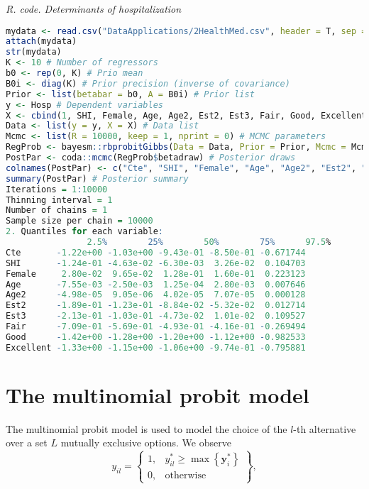 \begin{tcolorbox}[enhanced,width=4.67in,center upper,
	fontupper=\large\bfseries,drop shadow southwest,sharp corners]
	\textit{R. code. Determinants of hospitalization}
	\begin{VF}
		\begin{lstlisting}[language=R]	
mydata <- read.csv("DataApplications/2HealthMed.csv", header = T, sep = ",")
attach(mydata)
str(mydata)
K <- 10 # Number of regressors
b0 <- rep(0, K) # Prio mean
B0i <- diag(K) # Prior precision (inverse of covariance)
Prior <- list(betabar = b0, A = B0i) # Prior list
y <- Hosp # Dependent variables
X <- cbind(1, SHI, Female, Age, Age2, Est2, Est3, Fair, Good, Excellent) # Regressors
Data <- list(y = y, X = X) # Data list
Mcmc <- list(R = 10000, keep = 1, nprint = 0) # MCMC parameters
RegProb <- bayesm::rbprobitGibbs(Data = Data, Prior = Prior, Mcmc = Mcmc) # Inference using bayesm package
PostPar <- coda::mcmc(RegProb$betadraw) # Posterior draws
colnames(PostPar) <- c("Cte", "SHI", "Female", "Age", "Age2", "Est2", "Est3", "Fair", "Good", "Excellent") # Names
summary(PostPar) # Posterior summary
Iterations = 1:10000
Thinning interval = 1 
Number of chains = 1 
Sample size per chain = 10000
2. Quantiles for each variable:
				2.5%        25%        50%        75%      97.5%
Cte       -1.22e+00 -1.03e+00 -9.43e-01 -8.50e-01 -0.671744
SHI       -1.24e-01 -4.63e-02 -6.30e-03  3.26e-02  0.104703
Female     2.80e-02  9.65e-02  1.28e-01  1.60e-01  0.223123
Age       -7.55e-03 -2.50e-03  1.25e-04  2.80e-03  0.007646
Age2      -4.98e-05  9.05e-06  4.02e-05  7.07e-05  0.000128
Est2      -1.89e-01 -1.23e-01 -8.84e-02 -5.32e-02  0.012714
Est3      -2.13e-01 -1.03e-01 -4.73e-02  1.01e-02  0.109527
Fair      -7.09e-01 -5.69e-01 -4.93e-01 -4.16e-01 -0.269494
Good      -1.42e+00 -1.28e+00 -1.20e+00 -1.12e+00 -0.982533
Excellent -1.33e+00 -1.15e+00 -1.06e+00 -9.74e-01 -0.795881
\end{lstlisting}
	\end{VF}
\end{tcolorbox} 

\section{The multinomial probit model}\label{sec64}
The multinomial probit model is used to model the choice of the $l$-th alternative over a set $L$ mutually exclusive options.
We observe 
\begin{equation*}
y_{il}=
\begin{Bmatrix}
	1, & y_{il}^*\geq \max\left\{\bm{y}_i^*\right\}  \\
	0, & \text{otherwise}
\end{Bmatrix},
\end{equation*}

